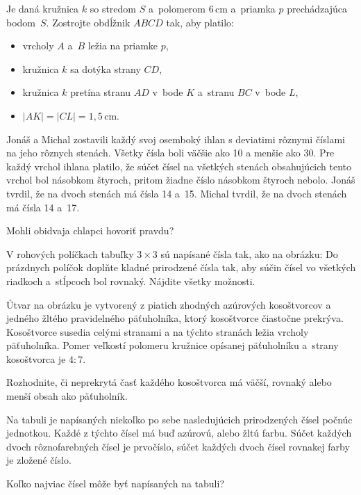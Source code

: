 {%
Je daná kružnica $k$ so stredom $S$ a~polomerom 6\,cm
a~priamka $p$ prechádzajúca bodom~$S$.
Zostrojte obdĺžnik $ABCD$ tak, aby platilo:
\begin{itemize}
  \item vrcholy $A$ a~$B$ ležia na priamke $p$,
  \item kružnica $k$ sa dotýka strany $CD$,
  \item kružnica $k$ pretína stranu $AD$ v~bode $K$ a~stranu $BC$ v~bode $L$,
  \item $|AK|=|CL|=1{,}5$\,cm.
\end{itemize}
}

{%
Jonáš a Michal zostavili každý svoj osemboký ihlan s deviatimi rôznymi číslami na jeho rôznych stenách.
Všetky čísla boli väčšie ako 10 a menšie ako 30.
Pre každý vrchol ihlana platilo, že súčet čísel na všetkých stenách obsahujúcich tento vrchol bol násobkom štyroch, pritom žiadne číslo násobkom štyroch nebolo.
Jonáš tvrdil, že na dvoch stenách má čísla 14 a~15.
Michal tvrdil, že na dvoch stenách má čísla 14 a~17.

Mohli obidvaja chlapci hovoriť pravdu?
}

{%
V rohových políčkach tabuľky $3\times3$ sú napísané čísla tak, ako na obrázku:
Do prázdnych políčok doplňte kladné prirodzené čísla tak, aby súčin čísel vo všetkých riadkoch a~stĺpcoch bol rovnaký.
Nájdite všetky možnosti.
}

{%
Útvar na obrázku je vytvorený z piatich zhodných azúrových kosoštvorcov a jedného žltého pravidelného päťuholníka, ktorý kosoštvorce čiastočne prekrýva.
Kosoštvorce susedia celými stranami a na týchto stranách ležia vrcholy päťuholníka.
Pomer veľkostí polomeru kružnice opísanej päťuholníku a~strany kosoštvorca je $4:7$.

Rozhodnite, či neprekrytá časť každého kosoštvorca má väčší, rovnaký alebo menší obsah ako päťuholník.
%
}

{%
Na tabuli je napísaných niekoľko po sebe nasledujúcich prirodzených čísel počnúc jednotkou.
Každé z týchto čísel má buď azúrovú, alebo žltú farbu.
Súčet každých dvoch rôznofarebných čísel je prvočíslo,
súčet každých dvoch čísel rovnakej farby je zložené číslo.

Koľko najviac čísel môže byť napísaných na tabuli?
}

